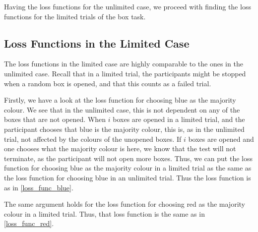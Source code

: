 Having the loss functions for the unlimited case, we proceed with finding the loss functions for the limited trials of the box task. 


\subsection{Loss Functions in the Limited Case}
The loss functions in the limited case are highly comparable to the ones in the unlimited case. Recall that in a limited trial, the participants might be stopped when a random box is opened, and that this counts as a failed trial. 

Firstly, we have a look at the loss function for choosing blue as the majority colour. We see that in the unlimited case, this is not dependent on any of the boxes that are not opened. When $i$ boxes are opened in a limited trial, and the participant chooses that blue is the majority colour, this is, as in the unlimited trial, not affected by the colours of the unopened boxes. If $i$ boxes are opened and one chooses what the majority colour is here, we know that the test will not terminate, as the participant will not open more boxes. Thus, we can put the loss function for choosing blue as the majority colour in a limited trial as the same as the loss function for choosing blue in an unlimited trial. Thus the loss function is as in \eqref{loss_func_blue}.

The same argument holds for the loss function for choosing red as the majority colour in a limited trial. Thus, that loss function is the same as in \eqref{loss_func_red}.

